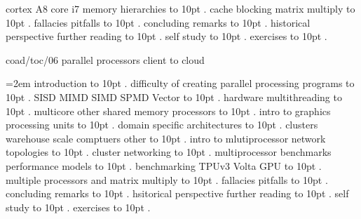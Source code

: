  cortex A8 core i7 memory hierarchies \leaders\hbox to 10pt {\hss.\hss}  \hfill {}
 cache blocking matrix multiply \leaders\hbox to 10pt {\hss.\hss}  \hfill {}
 fallacies pitfalls \leaders\hbox to 10pt {\hss.\hss}  \hfill {}
 concluding remarks \leaders\hbox to 10pt {\hss.\hss}  \hfill {}
 historical perspective further reading \leaders\hbox to 10pt {\hss.\hss}  \hfill {}
 self study \leaders\hbox to 10pt {\hss.\hss}  \hfill {}
 exercises \leaders\hbox to 10pt {\hss.\hss}  \hfill {}
\smallskip
\par\endgroup
\bigskip
{}
coad/toc/06 parallel processors client to cloud
\par\begingroup
\leftskip=2em
\smallskip
{} introduction \leaders\hbox to 10pt {\hss.\hss}  \hfill {}
 difficulty of creating parallel processing programs \leaders\hbox to 10pt {\hss.\hss}  \hfill {}
 SISD MIMD SIMD SPMD Vector \leaders\hbox to 10pt {\hss.\hss}  \hfill {}
 hardware multithreading \leaders\hbox to 10pt {\hss.\hss}  \hfill {}
 multicore other shared memory processors \leaders\hbox to 10pt {\hss.\hss}  \hfill {}
 intro to graphics processing units \leaders\hbox to 10pt {\hss.\hss}  \hfill {}
 domain specific architectures \leaders\hbox to 10pt {\hss.\hss}  \hfill {}
 clusters warehouse scale comptuers other \leaders\hbox to 10pt {\hss.\hss}  \hfill {}
 intro to mlutiprocessor network topologies \leaders\hbox to 10pt {\hss.\hss}  \hfill {}
 cluster networking \leaders\hbox to 10pt {\hss.\hss}  \hfill {}
 multiprocessor benchmarks performance models \leaders\hbox to 10pt {\hss.\hss}  \hfill {}
 benchmarking TPUv3 Volta GPU \leaders\hbox to 10pt {\hss.\hss}  \hfill {}
 multiple processors and matrix multiply \leaders\hbox to 10pt {\hss.\hss}  \hfill {}
 fallacies pitfalls \leaders\hbox to 10pt {\hss.\hss}  \hfill {}
 concluding remarks \leaders\hbox to 10pt {\hss.\hss}  \hfill {}
 hsitorical perspective further reading \leaders\hbox to 10pt {\hss.\hss}  \hfill {}
 self study \leaders\hbox to 10pt {\hss.\hss}  \hfill {}
 exercises \leaders\hbox to 10pt {\hss.\hss}  \hfill {}

